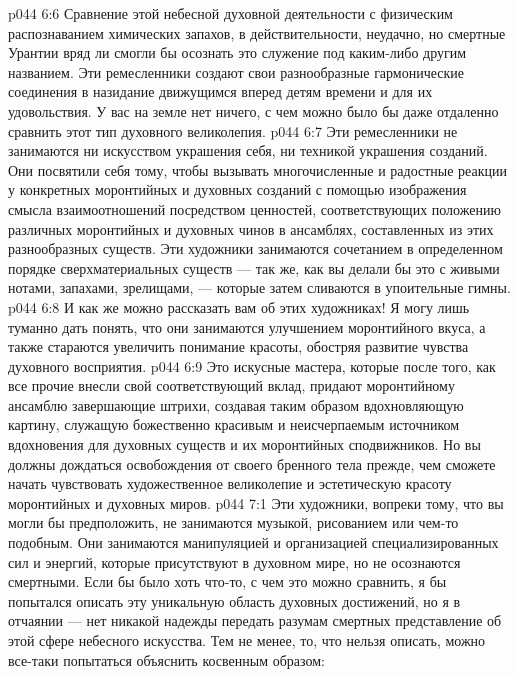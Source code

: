 \vs p044 6:6 \pc {}\bibnobreakspace {} Сравнение этой небесной духовной деятельности с физическим распознаванием химических запахов, в действительности, неудачно, но смертные Урантии вряд ли смогли бы осознать это служение под каким\hyp{}либо другим названием. Эти ремесленники создают свои разнообразные гармонические соединения в назидание движущимся вперед детям времени и для их удовольствия. У вас на земле нет ничего, с чем можно было бы даже отдаленно сравнить этот тип духовного великолепия.
\vs p044 6:7 \pc {}\bibnobreakspace {} Эти ремесленники не занимаются ни искусством украшения себя, ни техникой украшения созданий. Они посвятили себя тому, чтобы вызывать многочисленные и радостные реакции у конкретных моронтийных и духовных созданий с помощью изображения смысла взаимоотношений посредством ценностей, соответствующих положению различных моронтийных и духовных чинов в ансамблях, составленных из этих разнообразных существ. Эти художники занимаются сочетанием в определенном порядке сверхматериальных существ --- так же, как вы делали бы это с живыми нотами, запахами, зрелищами, --- которые затем сливаются в упоительные гимны.
\vs p044 6:8 \pc {}\bibnobreakspace {} И как же можно рассказать вам об этих художниках! Я могу лишь туманно дать понять, что они занимаются улучшением моронтийного вкуса, а также стараются увеличить понимание красоты, обостряя развитие чувства духовного восприятия.
\vs p044 6:9 \pc {}\bibnobreakspace {} Это искусные мастера, которые после того, как все прочие внесли свой соответствующий вклад, придают моронтийному ансамблю завершающие штрихи, создавая таким образом вдохновляющую картину, служащую божественно красивым и неисчерпаемым источником вдохновения для духовных существ и их моронтийных сподвижников. Но вы должны дождаться освобождения от своего бренного тела прежде, чем сможете начать чувствовать художественное великолепие и эстетическую красоту моронтийных и духовных миров.
\vs p044 7:1 Эти художники, вопреки тому, что вы могли бы предположить, не занимаются музыкой, рисованием или чем\hyp{}то подобным. Они занимаются манипуляцией и организацией специализированных сил и энергий, которые присутствуют в духовном мире, но не осознаются смертными. Если бы было хоть что\hyp{}то, с чем это можно сравнить, я бы попытался описать эту уникальную область духовных достижений, но я в отчаянии --- нет никакой надежды передать разумам смертных представление об этой сфере небесного искусства. Тем не менее, то, что нельзя описать, можно все\hyp{}таки попытаться объяснить косвенным образом:
